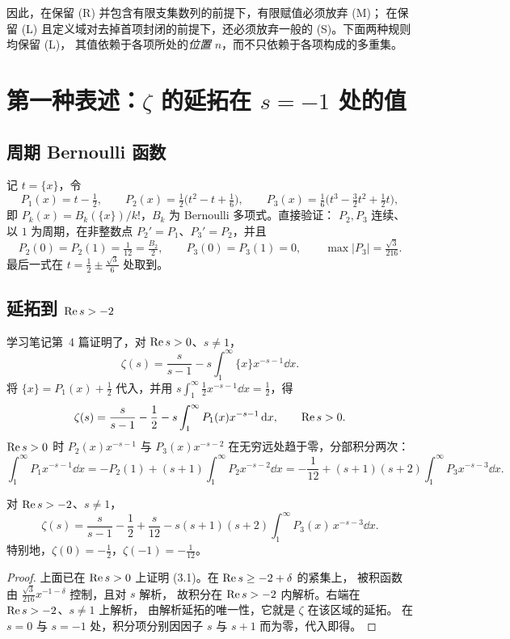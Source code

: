 \documentclass[11pt]{article}
\begin{document}
因此，在保留 (R) 并包含有限支集数列的前提下，有限赋值必须放弃 (M)；
在保留 (L) 且定义域对去掉首项封闭的前提下，还必须放弃一般的 (S)。下面两种规则均保留 (L)，
其值依赖于各项所处的\emph{位置} $n$，而不只依赖于各项构成的多重集。

\section{\texorpdfstring{第一种表述：$\zeta$ 的延拓在 $s=-1$ 处的值}{第一种表述：zeta 的延拓在 s=-1 处的值}}
\subsection{周期 Bernoulli 函数}
记 $t=\{x\}$，令
\[
 P_1(x)=t-\tfrac12,\qquad
 P_2(x)=\tfrac12\bigl(t^2-t+\tfrac16\bigr),\qquad
 P_3(x)=\tfrac16\bigl(t^3-\tfrac32t^2+\tfrac12t\bigr),
\]
即 $P_k(x)=B_k(\{x\})/k!$，$B_k$ 为 Bernoulli 多项式。直接验证：
$P_2,P_3$ 连续、以 $1$ 为周期，在非整数点 $P_2'=P_1$、$P_3'=P_2$，并且
\[
 P_2(0)=P_2(1)=\tfrac1{12}=\tfrac{B_2}{2},\qquad P_3(0)=P_3(1)=0,\qquad
 \max|P_3|=\tfrac{\sqrt3}{216}.
\]
最后一式在 $t=\tfrac12\pm\tfrac{\sqrt3}6$ 处取到。

\subsection{\texorpdfstring{延拓到 $\operatorname{Re} s>-2$}{延拓到 Re s>-2}}
学习笔记第~4 篇证明了，对 $\operatorname{Re} s>0$、$s\ne1$，
\[
 \zeta(s)=\frac{s}{s-1}-s\int_1^\infty\{x\}x^{-s-1}\dd x .
\]
将 $\{x\}=P_1(x)+\tfrac12$ 代入，并用 $s\int_1^\infty\tfrac12x^{-s-1}\dd x=\tfrac12$，得
\[
 \zeta(s)=\frac{s}{s-1}-\frac12-s\int_1^\infty P_1(x)x^{-s-1}\,\mathrm d x,\qquad\operatorname{Re} s>0.
\]
$\operatorname{Re} s>0$ 时 $P_2(x)x^{-s-1}$ 与 $P_3(x)x^{-s-2}$ 在无穷远处趋于零，分部积分两次：
\[
 \int_1^\infty P_1x^{-s-1}\dd x
 =-P_2(1)+(s+1)\int_1^\infty P_2x^{-s-2}\dd x
 =-\frac1{12}+(s+1)(s+2)\int_1^\infty P_3x^{-s-3}\dd x .
\]
\begin{proposition}\label{prop:zeta}
对 $\operatorname{Re} s>-2$、$s\ne1$，
\[
 \zeta(s)=\frac{s}{s-1}-\frac12+\frac{s}{12}
 -s(s+1)(s+2)\int_1^\infty P_3(x)\,x^{-s-3}\dd x .               \tag{3.1}
\]
特别地，$\zeta(0)=-\tfrac12$，$\zeta(-1)=-\tfrac1{12}$。
\end{proposition}
\begin{proof}
上面已在 $\operatorname{Re} s>0$ 上证明 (3.1)。在 $\operatorname{Re} s\ge-2+\delta$ 的紧集上，
被积函数由 $\tfrac{\sqrt3}{216}x^{-1-\delta}$ 控制，且对 $s$ 解析，
故积分在 $\operatorname{Re} s>-2$ 内解析。右端在 $\operatorname{Re} s>-2$、$s\ne1$ 上解析，
由解析延拓的唯一性，它就是 $\zeta$ 在该区域的延拓。
在 $s=0$ 与 $s=-1$ 处，积分项分别因因子 $s$ 与 $s+1$ 而为零，代入即得。
\end{proof}
\end{document}
